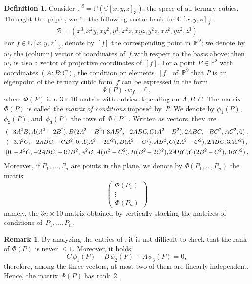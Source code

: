 \documentclass[11pt, a4paper, reqno, captions=tableheading,bibliography=totoc]{scrartcl}
\theoremstyle{plain}
\theoremstyle{definition}
\newtheorem{definition}[lemma]{Definition}
\newtheorem{rmk}[lemma]{Remark}
\newcommand{\C}{\mathbb{C}}
\newcommand{\p}{\mathbb{P}}
\newcommand\scalemath[2]{\scalebox{#1}{\mbox{\ensuremath{\displaystyle #2}}}}
\begin{document}
\begin{definition}
\label{definition:matrix_conditions}
 Consider $\p^9 = \p(\C[x,y,z]_3)$, the space of all ternary cubics.
 Throught this paper, we fix the following vector basis for $\C[x,y,z]_3$:
 \begin{eqnarray}
  \mathcal{B} = (x^3, x^2 y, x y^2, y^3, x^2 z, x y z, y^2 z, x z^2, y z^2, z^3)
  \label{vector_basis}
 \end{eqnarray}
 For $f \in \C[x,y,z]_3$, denote by $[f]$ the corresponding point in~$\p^9$; we denote by $w_f$ the (column) vector of coordinates of~$f$ with respect to the basis above; then $w_f$ is also a vector of projective coordinates of~$[f]$.
 For a point $P \in \p^2$ with coordinates $(A: B: C)$, the condition on elements~$[f]$ of~$\p^9$ that $P$ is an eigenpoint of the ternary cubic form~$f$ can be expressed in the form
 \[
  \Phi(P) \cdot w_f
  = 0 \,,
 \]
 where $\Phi(P)$ is a $3 \times 10$ matrix with entries depending on $A, B, C$.
 The matrix $\Phi(P)$ is called the \emph{matrix of conditions} imposed by~$P$.
We denote by $\phi_1(P)$, $\phi_2(P)$, and~$\phi_3(P)$ the rows of~$\Phi(P)$.
Written as vectors, they are
%
\begin{equation}
\label{equation:matrix_conditions_rows}
\begin{gathered}
\scalemath{0.9}{(-3A^2B, A(A^2 - 2B^2), B(2A^2 - B^2), 3AB^2,
 -2ABC, C(A^2 - B^2), 2 ABC,
 -B  C^2, A  C^2, 0)} \,, \\
\scalemath{0.9}{(-3A^2 C,
-2ABC,
-CB^2,
0,
A(A^2-2C^2),
B(A^2 - C^2),
AB^2,
C(2A^2-C^2),
2ABC,
3AC^2)} \,,\\
\scalemath{0.9}{(0,
-A^2C,
-2ABC,
-3CB^2,
A^2 B,
A(B^2 - C^2),
B(B^2-2C^2),
2ABC,
C(2B^2-C^2),
3BC^2)} \,.
\end{gathered}
\end{equation}
%
Moreover, if $P_1, \dotsc, P_n$ are points in the plane, we denote by $\Phi(P_1, \dotsc, P_n)$ the matrix
%
\[
 \left(
 \begin{array}{c}
  \Phi(P_1) \\
  \vdots \\
  \Phi(P_n)
 \end{array}
 \right)
\]
%
namely, the $3n \times 10$ matrix obtained by vertically stacking the matrices of conditions of~$P_1, \dotsc, P_n$.
\end{definition}

\begin{rmk}
By analyzing the entries of , it is not difficult to check that the rank of
$\Phi(P)$ is never $\leq 1$.
Moreover, it holds:
\begin{equation}
  C \, \phi_1(P) - B \, \phi_2(P) + A \, \phi_3(P) = 0,
  \label{eq:base}
\end{equation}
therefore,
among the three vectors, at most two of them are linearly independent.
Hence, the matrix~$\Phi(P)$ has rank~$2$.
\end{rmk}
\end{document}
